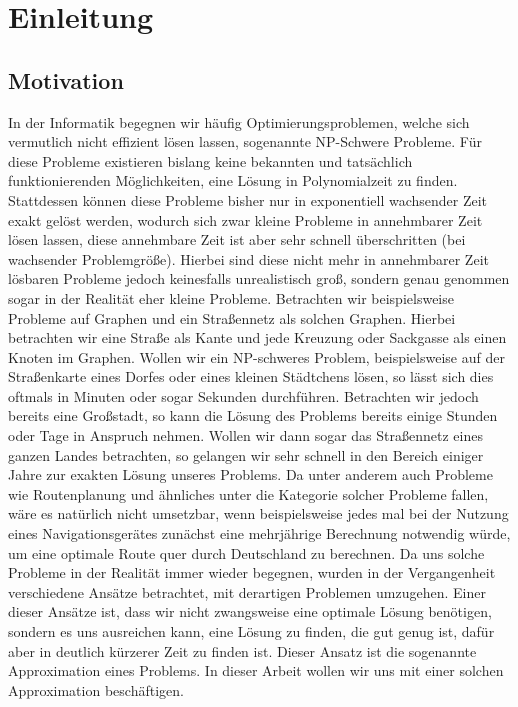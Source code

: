 \documentclass[12pt,onecolumn, notitlepage]{scrartcl}
\begin{document}


\section{Einleitung}
\subsection{Motivation}
In der Informatik begegnen wir häufig Optimierungsproblemen, welche sich vermutlich nicht effizient lösen lassen, sogenannte NP-Schwere Probleme. Für diese Probleme existieren bislang keine bekannten und tatsächlich funktionierenden Möglichkeiten, eine Lösung in Polynomialzeit zu finden. \newline
Stattdessen können diese Probleme bisher nur in exponentiell wachsender Zeit exakt gelöst werden, wodurch sich zwar kleine Probleme in annehmbarer Zeit lösen lassen, diese annehmbare Zeit ist aber sehr schnell überschritten (bei wachsender Problemgröße). Hierbei sind diese nicht mehr in annehmbarer Zeit lösbaren Probleme jedoch keinesfalls unrealistisch groß, sondern genau genommen sogar in der Realität eher kleine Probleme. Betrachten wir beispielsweise Probleme auf Graphen und ein Straßennetz als solchen Graphen. Hierbei betrachten wir eine Straße als Kante und jede Kreuzung oder Sackgasse als einen Knoten im Graphen. Wollen wir ein NP-schweres Problem, beispielsweise auf der Straßenkarte eines Dorfes oder eines kleinen Städtchens lösen, so lässt sich dies oftmals in Minuten oder sogar Sekunden durchführen.\newline
Betrachten wir jedoch bereits eine Großstadt, so kann die Lösung des Problems bereits einige Stunden oder Tage in Anspruch nehmen. Wollen wir dann sogar das Straßennetz eines ganzen Landes betrachten, so gelangen wir sehr schnell in den Bereich einiger Jahre zur exakten Lösung unseres Problems. Da unter anderem auch Probleme wie Routenplanung und ähnliches unter die Kategorie solcher Probleme fallen, wäre es natürlich nicht umsetzbar, wenn beispielsweise jedes mal bei der Nutzung eines Navigationsgerätes zunächst eine mehrjährige Berechnung notwendig würde, um eine optimale Route quer durch Deutschland zu berechnen. \newline
Da uns solche Probleme in der Realität immer wieder begegnen, wurden in der Vergangenheit verschiedene Ansätze betrachtet, mit derartigen Problemen umzugehen. Einer dieser Ansätze ist, dass wir nicht zwangsweise eine optimale Lösung benötigen, sondern es uns ausreichen kann, eine Lösung zu finden, die \glqq gut genug\grqq{} ist, dafür aber in deutlich kürzerer Zeit zu finden ist. Dieser Ansatz ist die sogenannte Approximation eines Problems. In dieser Arbeit wollen wir uns mit einer solchen Approximation beschäftigen.\newline
\end{document}
